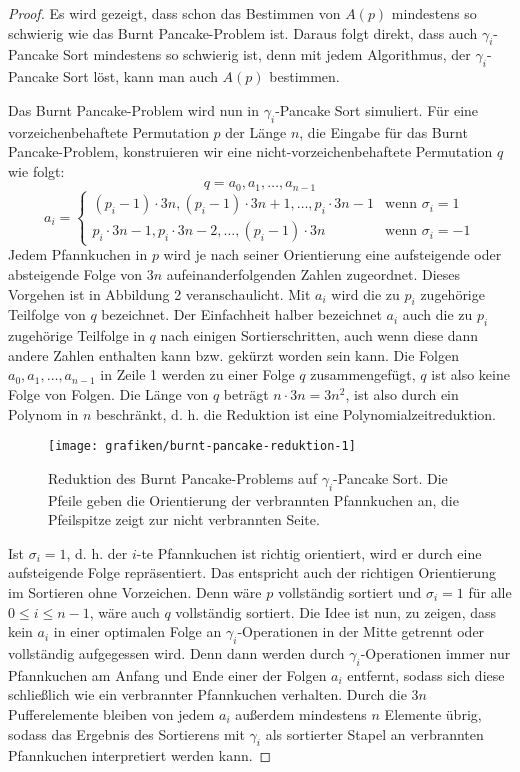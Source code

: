 \documentclass[a4paper, 10pt, ngerman]{article}
\begin{document}
\begin{proof}
    Es wird gezeigt, dass schon das Bestimmen von $A(p)$ mindestens so schwierig wie das Burnt Pancake-Problem ist. Daraus folgt direkt, dass auch $\gamma_i$-Pancake Sort mindestens so schwierig ist, denn mit jedem Algorithmus, der $\gamma_i$-Pancake Sort löst, kann man auch $A(p)$ bestimmen.

    Das Burnt Pancake-Problem wird nun in $\gamma_i$-Pancake Sort simuliert. Für eine vorzeichenbehaftete Permutation $p$ der Länge $n$, die Eingabe für das Burnt Pancake-Problem, konstruieren wir eine nicht-vorzeichenbehaftete Permutation $q$ wie folgt:
    $$
        q = a_0, a_1, \dots, a_{n-1}
    $$
    $$
        a_i  = \begin{cases}
            (p_i - 1) \cdot 3n, (p_i - 1) \cdot 3n + 1, \dots, p_i \cdot 3n - 1 
            & \text{wenn } \sigma_i = 1  \\
            p_i \cdot 3n - 1, p_i \cdot 3n - 2, \dots, (p_i - 1) \cdot 3n       
            & \text{wenn } \sigma_i = -1
        \end{cases}
    $$
    Jedem Pfannkuchen in $p$ wird je nach seiner Orientierung eine aufsteigende oder absteigende Folge von $3n$ aufeinanderfolgenden Zahlen zugeordnet. Dieses Vorgehen ist in Abbildung 2 veranschaulicht. Mit $a_i$ wird die zu $p_i$ zugehörige Teilfolge von $q$ bezeichnet. Der Einfachheit halber bezeichnet $a_i$ auch die zu $p_i$ zugehörige Teilfolge in $q$ nach einigen Sortierschritten, auch wenn diese dann andere Zahlen enthalten kann bzw. gekürzt worden sein kann. Die Folgen $a_0, a_1, \dots, a_{n-1}$ in Zeile 1 werden zu einer Folge $q$ zusammengefügt, $q$ ist also keine Folge von Folgen. Die Länge von $q$ beträgt $n \cdot 3n = 3n^2$, ist also durch ein Polynom in $n$ beschränkt, d. h. die Reduktion ist eine Polynomialzeitreduktion.

    \begin{figure}[h]
        \centering
        \texttt{[image: grafiken/burnt-pancake-reduktion-1]}
        \caption{Reduktion des Burnt Pancake-Problems auf $\gamma_i$-Pancake Sort. Die Pfeile geben die Orientierung der verbrannten Pfannkuchen an, die Pfeilspitze zeigt zur nicht verbrannten Seite.}
    \end{figure}
    Ist $\sigma_i = 1$, d. h. der $i$-te Pfannkuchen ist richtig orientiert, wird er durch eine aufsteigende Folge repräsentiert. Das entspricht auch der richtigen Orientierung im Sortieren ohne Vorzeichen. Denn wäre $p$ vollständig sortiert und $\sigma_i = 1$ für alle $0 \le i \le n - 1$, wäre auch $q$ vollständig sortiert. Die Idee ist nun, zu zeigen, dass kein $a_i$ in einer optimalen Folge an $\gamma_i$-Operationen in der Mitte getrennt oder vollständig aufgegessen wird. Denn dann werden durch $\gamma_i$-Operationen immer nur Pfannkuchen am Anfang und Ende einer der Folgen $a_i$ entfernt, sodass sich diese schließlich wie ein verbrannter Pfannkuchen verhalten. Durch die $3n$ Pufferelemente bleiben von jedem $a_i$ außerdem mindestens $n$ Elemente übrig, sodass das Ergebnis des Sortierens mit $\gamma_i$ als sortierter Stapel an verbrannten Pfannkuchen interpretiert werden kann.


\end{proof}
\end{document}
